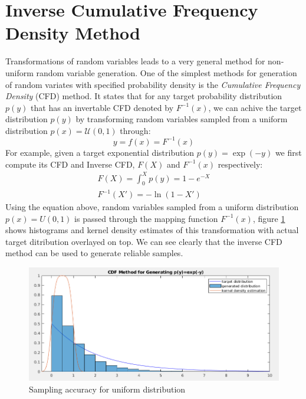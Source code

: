 \documentclass{article}
\begin{document}
\section{Inverse Cumulative Frequency Density Method}
Transformations of random variables leads to a very general method for non-uniform random variable generation. One of the simplest methods for generation of random variates with specified probability density is the \textit{Cumulative Frequency Density} (CFD) method. It states that for any target probability distribution $p(y)$ that has an invertable CFD denoted by $F^{-1}(x)$, we can achive the target distribution $p(y)$ by transforming random variables sampled from a uniform distribution $p(x)=\mathcal{U}(0,1)$ through:
\begin{equation}
	y = f(x) = F^{-1}(x)
\end{equation}
For example, given a target exponential distribution $p(y) = \exp(-y)$ we first compute its CFD and Inverse CFD, $F(X)$ and $F^{-1}(x)$ respectively:
\begin{eqnarray}
	F(X)=\int_{0}^{X}p(y)=1-e^{-X}\\
	F^{-1}(X')=-\ln (1-X')
\end{eqnarray}
Using the equation above, random variables sampled from a uniform distribution $p(x)=U(0,1)$ is passed through the mapping function $F^{-1}(x)$, figure \ref{fig:cdf} shows histograms and kernel density estimates of this transformation with actual target ditribution overlayed on top. We can see clearly that the inverse CFD method can be used to generate reliable samples.
\begin{figure}[htp]
 \centering
 \includegraphics[width=0.7\linewidth]{task_4.png}
 \caption{Sampling accuracy for uniform distribution}
 \label{fig:cdf}
\end{figure}
\end{document}
